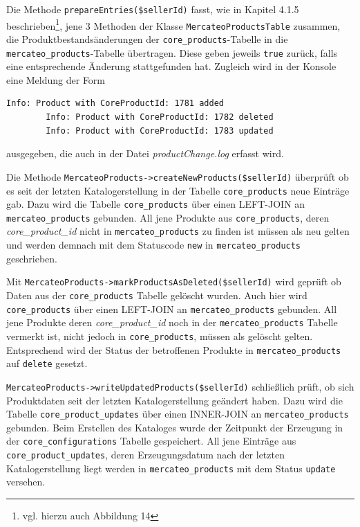 	Die Methode \texttt{prepareEntries(\$sellerId)} fasst, wie in Kapitel 4.1.5 beschrieben\footnote{vgl. hierzu auch Abbildung 14}, jene 3 Methoden der Klasse \texttt{MercateoProductsTable} zusammen, die Produktbestandsänderungen der \texttt{core\_products}-Tabelle in die \texttt{mercateo\_products}-Tabelle übertragen. 
	Diese geben jeweils \texttt{true} zurück, falls eine entsprechende Änderung stattgefunden hat. Zugleich wird in der Konsole eine Meldung der Form 	
		\begin{lstlisting}[caption={Konsolenausgabe bei der Transaktion T\_UPDATE\_PRODUCTS}]
		Info: Product with CoreProductId: 1781 added
		Info: Product with CoreProductId: 1782 deleted
		Info: Product with CoreProductId: 1783 updated
		\end{lstlisting} ausgegeben, die auch in der Datei \textit{productChange.log} erfasst wird.
	
	Die Methode \texttt{MercateoProducts->createNewProducts(\$sellerId)} überprüft ob es seit der letzten Katalogerstellung in der Tabelle \texttt{core\_products} neue Einträge gab. Dazu wird die Tabelle \texttt{core\_products} über einen LEFT-JOIN an \texttt{mercateo\_products}  gebunden. All jene Produkte aus \texttt{core\_products}, deren \textit{core\_product\_id} nicht in \texttt{mercateo\_products} zu finden ist müssen als neu gelten und werden demnach mit dem Statuscode \texttt{new} in \texttt{mercateo\_products} geschrieben. 
	
	Mit \texttt{MercateoProducts->markProductsAsDeleted(\$sellerId)} wird geprüft ob Daten aus der \texttt{core\_products} Tabelle gelöscht wurden. Auch hier wird \texttt{core\_products} über einen LEFT-JOIN an \texttt{mercateo\_products} gebunden. All jene Produkte deren \textit{core\_product\_id} 
	noch in der \texttt{mercateo\_products} Tabelle vermerkt ist, nicht jedoch in \texttt{core\_products}, müssen als gelöscht gelten. Entsprechend wird der Status der betroffenen Produkte in \texttt{mercateo\_products} auf \texttt{delete} gesetzt.
	
	\texttt{MercateoProducts->writeUpdatedProducts(\$sellerId)} schließlich prüft, ob sich Produktdaten seit der letzten Katalogerstellung geändert haben. Dazu wird die Tabelle \texttt{core\_product\_updates} über einen INNER-JOIN an \texttt{mercateo\_products} gebunden.
	Beim Erstellen des Kataloges wurde der Zeitpunkt der Erzeugung in der \texttt{core\_configurations} Tabelle gespeichert. All jene Einträge aus \texttt{core\_product\_updates}, deren Erzeugungsdatum nach der letzten Katalogerstellung liegt werden in \texttt{mercateo\_products} mit dem Status \texttt{update} versehen.
	
